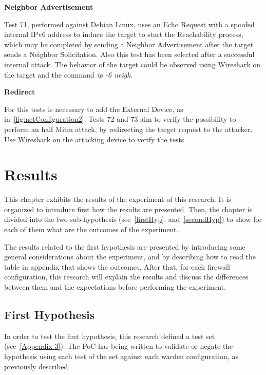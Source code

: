 \documentclass[12pt]{article}
\begin{document}
\textbf{Neighbor Advertisement}

Test 71, performed against Debian Linux, uses an Echo Request with a spoofed internal IPv6 address to induce the target to start the Reachability process, which may be completed by sending a Neighbor Advertisement after the target sends a Neighbor Solicitation. Also this test has been selected after a successful internal attack. The behavior of the target could be observed using Wireshark on the target and the command \textit{ip -6 neigh}.

\textbf{Redirect}

For this tests is necessary to add the External Device, as in~\cref{fig:netConfiguration2}. Tests 72 and 73 aim to verify the possibility to perform an half Mitm attack, by redirecting the target request to the attacker. Use Wireshark on the attacking device to verify the tests.

\pagebreak

\section{Results}
\label{sec:6}


This chapter exhibits the results of the experiment of this research. It is organized to introduce first how the results are presented. Then, the chapter is divided into the two sub-hypothesis (see~\ref{firstHyp}, and~\ref{secondHyp}) to show for each of them what are the outcomes of the experiment.

The results related to the first hypothesis are presented by introducing some general considerations about the experiment, and by describing how to read the table in appendix that shows the outcomes. After that, for each firewall configuration, this research will explain the results and discuss the differences between them and the expectations before performing the experiment.

\subsection{First Hypothesis}
\label{resultsFirstHypothesis}

In order to test the first hypothesis, this research defined a test set (see~\cref{Appendix 3}). The PoC has being written to validate or negate the hypothesis using each test of the set against each warden configuration, as previously described.
\end{document}
